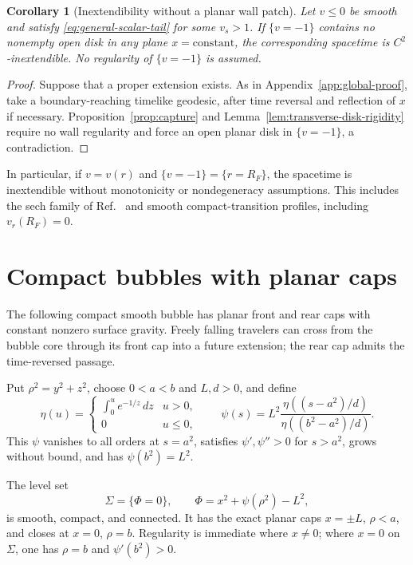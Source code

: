 \documentclass[10pt]{article}
\newtheorem{corollary}[theorem]{Corollary}
\begin{document}
\begin{corollary}[Inextendibility without a planar wall patch]
\label{cor:alcubierre-maximality}
Let \(v\leq0\) be smooth and satisfy \eqref{eq:general-scalar-tail} for
some \(v_s>1\).
If \(\{v=-1\}\) contains no nonempty open disk in any plane
\(x=\mathrm{constant}\), the corresponding spacetime is
\(C^2\)-inextendible.  No regularity of \(\{v=-1\}\) is assumed.
\end{corollary}

\begin{proof}
Suppose that a proper extension exists.  As in
Appendix~\ref{app:global-proof}, take a boundary-reaching timelike geodesic,
after time reversal and reflection of \(x\) if necessary.
Proposition~\ref{prop:capture} and Lemma~\ref{lem:transverse-disk-rigidity}
require no wall regularity and force an open planar disk in \(\{v=-1\}\),
a contradiction.
\end{proof}

In particular, if \(v=v(r)\) and \(\{v=-1\}=\{r=R_F\}\), the spacetime
is inextendible without monotonicity or nondegeneracy assumptions.  This
includes the sech family of Ref.~\cite{FinazziLiberatiBarcelo2009} and
smooth compact-transition profiles, including \(v_r(R_F)=0\).


\section{Compact bubbles with planar caps}
\label{sec:compact-cap}

The following compact smooth bubble has planar front and rear caps with
constant nonzero surface gravity.  Freely falling travelers can cross from
the bubble core through its front cap into a future extension; the rear
cap admits the time-reversed passage.

\begin{samepage}
Put \(\rho^2=y^2+z^2\), choose \(0<a<b\) and \(L,d>0\), and define
\begin{equation}
 \eta(u)=\begin{cases}\displaystyle\int_0^u e^{-1/z}\,dz&u>0,\\0&u\leq0,
 \end{cases}
 \qquad
 \psi(s)=L^2\frac{\eta((s-a^2)/d)}{\eta((b^2-a^2)/d)}.
 \label{eq:explicit-cap-shape}
\end{equation}
This \(\psi\) vanishes to all orders at \(s=a^2\), satisfies
\(\psi',\psi''>0\) for \(s>a^2\), grows without bound, and has
\(\psi(b^2)=L^2\).
\end{samepage}
The level set
\begin{equation}
  \Sigma=\{\Phi=0\},
  \qquad
  \Phi=x^2+\psi(\rho^2)-L^2,
  \label{eq:compact-flat-cap-wall}
\end{equation}
is smooth, compact, and connected.  It has the exact planar caps
\(x=\pm L\), \(\rho<a\), and closes at \(x=0\), \(\rho=b\).  Regularity is
immediate where \(x\ne0\); where \(x=0\) on \(\Sigma\), one has \(\rho=b\)
and \(\psi'(b^2)>0\).
\end{document}

